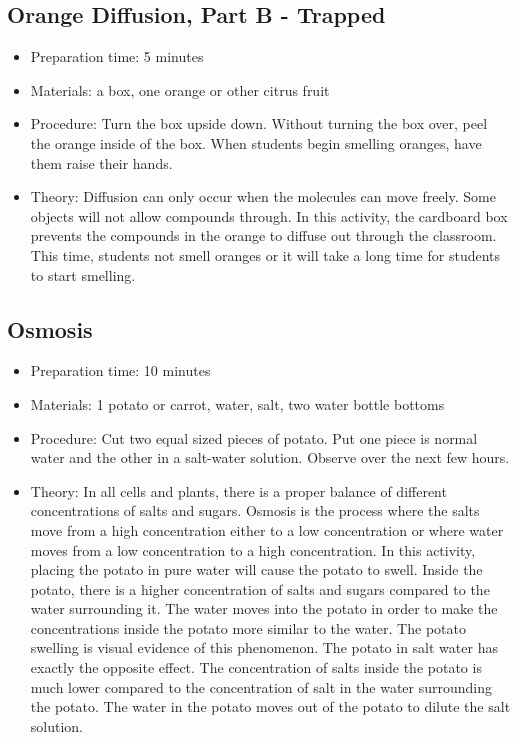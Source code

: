 \subsection{Orange Diffusion, Part B - Trapped}
\begin{itemize}
\item{Preparation time: 5 minutes}
\item{Materials: a box, one orange or other citrus fruit}
\item{Procedure: Turn the box upside down. Without turning the box over, peel the orange inside of the box. When students begin smelling oranges, have them raise their hands.}
\item{Theory: Diffusion can only occur when the molecules can move freely. Some objects will not allow compounds through. In this activity, the cardboard box prevents the compounds in the orange to diffuse out through the classroom. This time, students not smell oranges or it will take a long time for students to start smelling.}
\end{itemize}

\subsection{Osmosis}
\begin{itemize}
\item{Preparation time: 10 minutes}
\item{Materials: 1 potato or carrot, water, salt, two water bottle bottoms}
\item{Procedure: Cut two equal sized pieces of potato. Put one piece is normal water and the other in a salt-water solution. Observe over the next few hours.}
\item{Theory: In all cells and plants, there is a proper balance of different concentrations of salts and sugars. Osmosis is the process where the salts move from a high concentration either to a low concentration or where water moves from a low concentration to a high concentration. In this activity, placing the potato in pure water will cause the potato to swell. Inside the potato, there is a higher concentration of salts and sugars compared to the water surrounding it. The water moves into the potato in order to make the concentrations inside the potato more similar to the water. The potato swelling is visual evidence of this phenomenon. The potato in salt water has exactly the opposite effect. The concentration of salts inside the potato is much lower compared to the concentration of salt in the water surrounding the potato. The water in the potato moves out of the potato to dilute the salt solution. }
\end{itemize}


